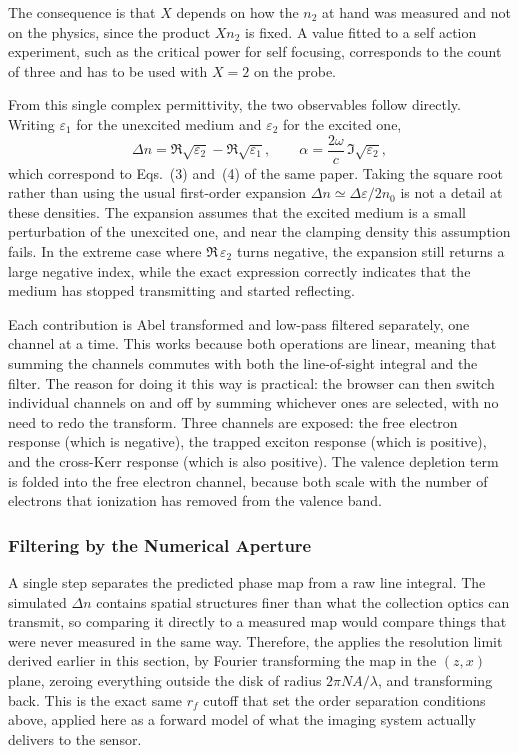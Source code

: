 The consequence is that $X$ depends on how the $n_2$ at hand was measured and
not on the physics, since the product $X n_2$ is fixed. A value fitted to a
self action experiment, such as the critical power for self focusing,
corresponds to the count of three and has to be used with $X=2$ on the probe. 


From this single complex permittivity, the two observables follow directly. Writing $\varepsilon_1$ for the unexcited medium and $\varepsilon_2$ for the excited one,
\begin{equation}
\label{eq:martin_obs}
\Delta n = \Re\sqrt{\varepsilon_2}-\Re\sqrt{\varepsilon_1},
\qquad
\alpha = \frac{2\omega}{c}\,\Im\sqrt{\varepsilon_2},
\end{equation}
which correspond to Eqs.~(3) and~(4) of the same paper. Taking the square root rather than using the usual first-order expansion $\Delta n\simeq\Delta\varepsilon/2n_0$ is not a detail at these densities. The expansion assumes that the excited medium is a small perturbation of the unexcited one, and near the clamping density this assumption fails. In the extreme case where $\Re\,\varepsilon_2$ turns negative, the expansion still returns a large negative index, while the exact expression correctly indicates that the medium has stopped transmitting and started reflecting.


Each contribution is Abel transformed and low-pass filtered separately, one channel at a time. This works because both operations are linear, meaning that summing the channels commutes with both the line-of-sight integral and the filter. The reason for doing it this way is practical: the browser can then switch individual channels on and off by summing whichever ones are selected, with no need to redo the transform. Three channels are exposed: the free electron response (which is negative), the trapped exciton response (which is positive), and the cross-Kerr response (which is also positive). The valence depletion term is folded into the free electron channel, because both scale with the number of electrons that ionization has removed from the valence band.

\subsubsection{Filtering by the Numerical Aperture}

A single step separates the predicted phase map from a raw line integral. The simulated $\Delta n$ contains spatial structures finer than what the collection optics can transmit, so comparing it directly to a measured map would compare things that were never measured in the same way. Therefore, the applies the resolution limit derived earlier in this section, by Fourier transforming the map in the $(z,x)$ plane, zeroing everything outside the disk of radius $2\pi NA/\lambda$, and transforming back. This is the exact same $r_f$ cutoff that set the order separation conditions above, applied here as a forward model of what the imaging system actually delivers to the sensor.
